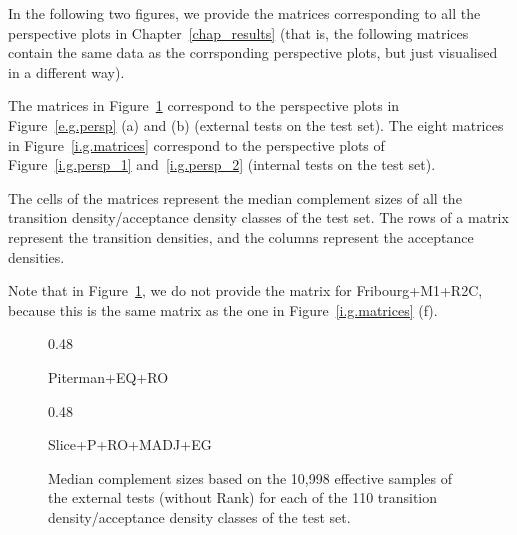 In the following two figures, we provide the matrices corresponding to all the perspective plots in Chapter~\ref{chap_results} (that is, the following matrices contain the same data as the corrsponding perspective plots, but just visualised in a different way).

The matrices in Figure~\ref{e.g.matrices} correspond to the perspective plots in Figure~\ref{e.g.persp} (a) and (b) (external tests on the \goal{} test set). The eight matrices in Figure~\ref{i.g.matrices} correspond to the perspective plots of Figure~\ref{i.g.persp_1} and~\ref{i.g.persp_2} (internal tests on the \goal{} test set).

The cells of the matrices represent the median complement sizes of all the transition density/acceptance density classes of the \goal{} test set. The rows of a matrix represent the transition densities, and the columns represent the acceptance densities.

Note that in Figure~\ref{e.g.matrices}, we do not provide the matrix for Fribourg+M1+R2C, because this is the same matrix as the one in Figure~\ref{i.g.matrices} (f).



\renewcommand{\arraystretch}{1.4}

\def\subwidth{0.48}


\vskip1.5cm

\begin{figure}[htb]
  \centering
  \begin{scriptsize}
  \renewcommand{\tabcolsep}{0.05cm}
  \begin{subtable}[t]{\subwidth\textwidth}
    \centering
    
    \caption{Piterman+EQ+RO}
  \end{subtable}
  \hfill
  \begin{subtable}[t]{\subwidth\textwidth}
    \centering
    
    \caption{Slice+P+RO+MADJ+EG}
  \end{subtable}
\end{scriptsize}
\caption{Median complement sizes based on the 10,998 effective samples of the external tests (without Rank) for each of the 110 transition density/acceptance density classes of the \goal{} test set.}
\label{e.g.matrices}
\end{figure}

